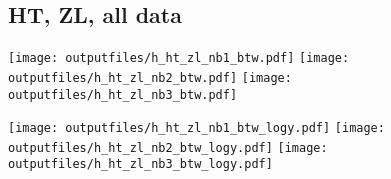 \documentclass[11pt]{article}
\begin{document}
     \subsection{ HT, ZL, all data}

    \noindent
     \texttt{[image: outputfiles/h\_ht\_zl\_nb1\_btw.pdf]}
     \texttt{[image: outputfiles/h\_ht\_zl\_nb2\_btw.pdf]}
     \texttt{[image: outputfiles/h\_ht\_zl\_nb3\_btw.pdf]}

    \noindent
     \texttt{[image: outputfiles/h\_ht\_zl\_nb1\_btw\_logy.pdf]}
     \texttt{[image: outputfiles/h\_ht\_zl\_nb2\_btw\_logy.pdf]}
     \texttt{[image: outputfiles/h\_ht\_zl\_nb3\_btw\_logy.pdf]}


   \clearpage







\end{document}
